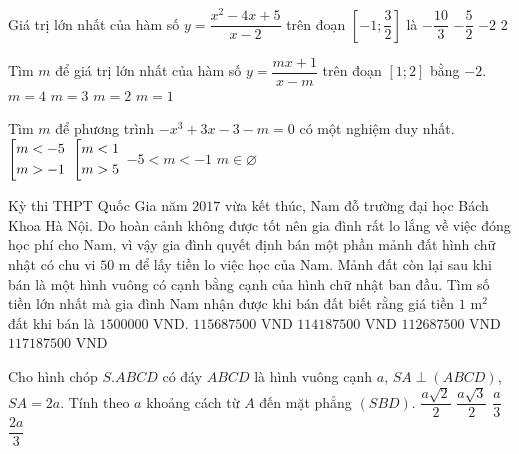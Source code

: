 \begin{ex}%
Giá trị lớn nhất của hàm số $y=\dfrac{x^{2}-4x+5}{x-2}$ trên đoạn $\left[-1;\dfrac{3}{2}\right]$ là
\choice
{$-\dfrac{10}{3}$}
{\True $-\dfrac{5}{2}$}
{$-2$}
{$2$}
\end{ex}
\begin{ex}%
Tìm $m$ để giá trị lớn nhất của hàm số $y=\dfrac{mx+1}{x-m}$ trên đoạn $[1;2]$ bằng $-2$.
\choice
{$m=4$}
{\True $m=3$}
{$m=2$}
{$m=1$}
\end{ex}
\begin{ex}%
Tìm $m$ để phương trình $-x^{3}+3x-3-m=0$ có một nghiệm duy nhất.
\choice
{\True $\left[\begin{aligned}&m<-5\\ &m>-1\end{aligned}\right.$}
{$\left[\begin{aligned}&m<1\\ &m>5\end{aligned}\right.$}
{$-5<m<-1$}
{$m\in\varnothing$}
\end{ex}
\begin{ex}%
Kỳ thi THPT Quốc Gia năm $2017$ vừa kết thúc, Nam đỗ trường đại học Bách Khoa Hà Nội. Do hoàn cảnh không được tốt nên gia đình rất lo lắng về việc đóng học phí cho Nam, vì vậy gia đình quyết định bán một phần mảnh đất hình chữ nhật có chu vi $50$ m để lấy tiền lo việc học của Nam. Mảnh đất còn lại sau khi bán là một hình vuông có cạnh bằng cạnh của hình chữ nhật ban đầu. Tìm số tiền lớn nhất mà gia đình Nam nhận được khi bán đất biết rằng giá tiền $1$ m$^{2}$ đất khi bán là $1500000$ VND.
\choice
{$115687500$ VND}
{$114187500$ VND}
{$112687500$ VND}
{\True $117187500$ VND}
\end{ex}
\begin{ex}%
Cho hình chóp $S.ABCD$ có đáy $ABCD$ là hình vuông cạnh $a$, $SA\perp (ABCD)$, $SA=2a$. Tính theo $a$ khoảng cách từ $A$ đến mặt phẳng $(SBD)$.
\choice
{$\dfrac{a\sqrt{2}}{2}$}
{$\dfrac{a\sqrt{3}}{2}$}
{$\dfrac{a}{3}$}
{\True $\dfrac{2a}{3}$}
\end{ex}
